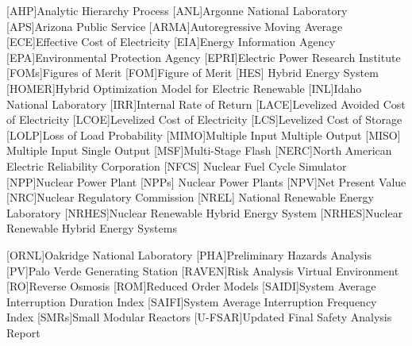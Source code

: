 \documentclass[12pt]{UIdahoMastersThesis}
\begin{document}
\begin{acronym}[NRHES]  %
	[AHP]{Analytic Hierarchy Process}
    [ANL]{Argonne National Laboratory}
    [APS]{Arizona Public Service}
    [ARMA]{Autoregressive Moving Average}
    [ECE]{Effective Cost of Electricity}
    [EIA]{Energy Information Agency}
    [EPA]{Environmental Protection Agency}
    [EPRI]{Electric Power Research Institute}
    [FOMs]{Figures of Merit}
    [FOM]{Figure of Merit}
    [HES] {Hybrid Energy System}
    [HOMER]{Hybrid Optimization Model for Electric Renewable}
    [INL]{Idaho National Laboratory}
    [IRR]{Internal Rate of Return}
    [LACE]{Levelized Avoided Cost of Electricity}
    [LCOE]{Levelized Cost of Electricity}
    [LCS]{Levelized Cost of Storage}
    [LOLP]{Loss of Load Probability}
    [MIMO]{Multiple Input Multiple Output}
    [MISO] {Multiple Input Single Output}
    [MSF]{Multi-Stage Flash}
    [NERC]{North American Electric Reliability Corporation}
    [NFCS] {Nuclear Fuel Cycle Simulator}
    [NPP]{Nuclear Power Plant}
    [NPPs] {Nuclear Power Plants}
    [NPV]{Net Present Value}
    [NRC]{Nuclear Regulatory Commission}
     [NREL] {National Renewable Energy Laboratory}
    [NRHES]{Nuclear Renewable Hybrid Energy System}
    [NRHES]{Nuclear Renewable Hybrid Energy Systems}
    
    [ORNL]{Oakridge National Laboratory}
    [PHA]{Preliminary Hazards Analysis}
    [PV]{Palo Verde Generating Station}
    [RAVEN]{Risk Analysis Virtual Environment}
    [RO]{Reverse Osmosis}
    [ROM]{Reduced Order Models}
    [SAIDI]{System Average Interruption Duration Index}
    [SAIFI]{System Average Interruption Frequency Index}
    [SMRs]{Small Modular Reactors}
    [U-FSAR]{Updated Final Safety Analysis Report} 
\end{acronym}
\end{document}
